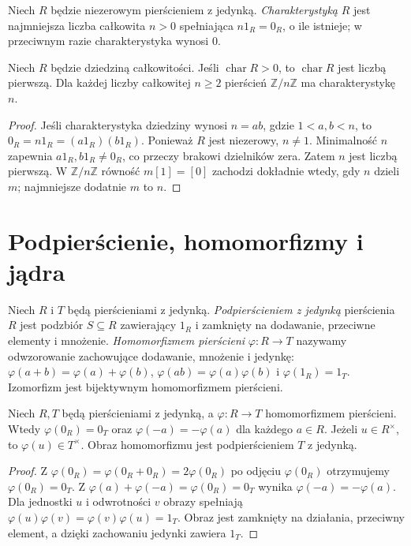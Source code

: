 \begin{definicja}
\label{aa:def:char-ring}
Niech $R$ będzie niezerowym pierścieniem z jedynką.
\emph{Charakterystyką} $R$ jest najmniejsza liczba całkowita
$n>0$ spełniająca $n1_R=0_R$, o ile istnieje;
w przeciwnym razie charakterystyka wynosi $0$.
\end{definicja}
\begin{stwierdzenie}
\label{aa:st:char-domain}
Niech $R$ będzie dziedziną całkowitości. Jeśli
$\operatorname{char}R>0$, to $\operatorname{char}R$ jest liczbą pierwszą.
Dla każdej liczby całkowitej
$n\ge2$ pierścień $\mathbb Z/n\mathbb Z$ ma charakterystykę $n$.
\end{stwierdzenie}
\begin{proof}
Jeśli charakterystyka dziedziny wynosi $n=ab$, gdzie
$1<a,b<n$, to $0_R=n1_R=(a1_R)(b1_R)$.
Ponieważ $R$ jest niezerowy, $n\ne1$. Minimalność $n$ zapewnia
$a1_R,b1_R\ne0_R$, co przeczy brakowi dzielników zera.
Zatem $n$ jest liczbą pierwszą.
W $\mathbb Z/n\mathbb Z$ równość $m[1]=[0]$ zachodzi
dokładnie wtedy, gdy $n$ dzieli $m$; najmniejsze dodatnie $m$
to $n$.
\end{proof}

\section{Podpierścienie, homomorfizmy i jądra}
\begin{definicja}
\label{aa:def:ring-hom}
Niech $R$ i $T$ będą pierścieniami z jedynką.
\emph{Podpierścieniem z jedynką} pierścienia $R$ jest podzbiór
$S\subseteq R$ zawierający $1_R$ i zamknięty na dodawanie,
przeciwne elementy i mnożenie. \emph{Homomorfizmem pierścieni}
$\varphi:R\to T$ nazywamy odwzorowanie zachowujące dodawanie,
mnożenie i jedynkę: $\varphi(a+b)=\varphi(a)+\varphi(b)$,
$\varphi(ab)=\varphi(a)\varphi(b)$ i $\varphi(1_R)=1_T$.
Izomorfizm jest bijektywnym homomorfizmem pierścieni.
\end{definicja}
\begin{lemat}
\label{aa:lem:ring-hom-properties}
Niech $R,T$ będą pierścieniami z jedynką,
a $\varphi:R\to T$ homomorfizmem pierścieni.
Wtedy $\varphi(0_R)=0_T$ oraz
$\varphi(-a)=-\varphi(a)$ dla każdego $a\in R$.
Jeżeli $u\in R^\times$, to $\varphi(u)\in T^\times$.
Obraz homomorfizmu jest podpierścieniem $T$ z jedynką.
\end{lemat}
\begin{proof}
Z $\varphi(0_R)=\varphi(0_R+0_R)=2\varphi(0_R)$
po odjęciu $\varphi(0_R)$ otrzymujemy $\varphi(0_R)=0_T$.
Z $\varphi(a)+\varphi(-a)=\varphi(0_R)=0_T$
wynika $\varphi(-a)=-\varphi(a)$. Dla jednostki $u$
i odwrotności $v$ obrazy spełniają
$\varphi(u)\varphi(v)=\varphi(v)\varphi(u)=1_T$.
Obraz jest zamknięty na działania, przeciwny element,
a dzięki zachowaniu jedynki zawiera $1_T$.
\end{proof}

